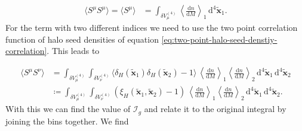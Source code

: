 \documentclass[oneside]{book}
\newcommand*{\rd}{\mathrm{d}}
\begin{document}
\begin{align}
    \langle S^\mu  S^\mu \rangle = \langle S^\mu \rangle &= \int_{\delta V^{(4)}_\mu} \left\langle \frac{\rd n}{\rd M} \right\rangle_1 \,\rd^4 \tilde{\boldsymbol{x}}_1.
\end{align}
For the term with two different indices we need to use the two point correlation function of halo seed densities of equation \ref{eq:two-point-halo-seed-denstiy-correlation}. This leads to 

\begin{align}
    \langle S^\mu  S^\nu \rangle &= \int_{\delta V^{(4)}_\mu} \int_{\delta V^{(4)}_\nu} \langle \delta_H(\tilde{\boldsymbol{x}}_1) \delta_H(\tilde{\boldsymbol{x}}_2) -1 \rangle\,\left\langle \frac{\rd n}{\rd M} \right\rangle_1 \left\langle \frac{\rd n}{\rd M} \right\rangle_2\,\rd^4 \tilde{\boldsymbol{x}}_1 \, \rd^4 \tilde{\boldsymbol{x}}_2\\
&\coloneqq \int_{\delta V^{(4)}_\mu} \int_{\delta V^{(4)}_\nu} ( \xi_H(\tilde{\boldsymbol{x}}_1,\tilde{\boldsymbol{x}}_2) -1 )\,\left\langle \frac{\rd n}{\rd M} \right\rangle_1 \left\langle \frac{\rd n}{\rd M} \right\rangle_2\,\rd^4 \tilde{\boldsymbol{x}}_1 \, \rd^4 \tilde{\boldsymbol{x}}_2.
\end{align}
With this we can find the value of $\mathcal{I}_g$ and relate it to the original integral by joining the bins together. We find
\end{document}
